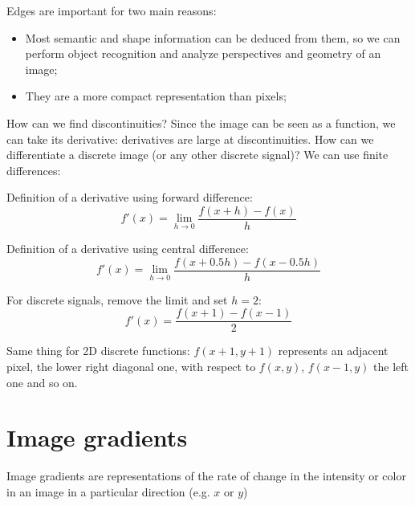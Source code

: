 \documentclass{article}
\begin{document}
Edges are important for two main reasons:

\begin{itemize}
    \item Most semantic and shape information can be deduced from them, so we can perform object recognition and analyze perspectives and geometry of an image;
    \item They are a more compact representation than pixels;
\end{itemize}

How can we find discontinuities? Since the image can be seen as a function, we can take its derivative: derivatives are large at discontinuities.
How can we differentiate a discrete image (or any other discrete signal)? We can use finite differences:

\vspace{0.5cm}

Definition of a derivative using forward difference:
\begin{equation*}
    f'(x) = \lim_{h\to 0} \frac{f(x + h) - f(x)}{h}
\end{equation*}

\vspace{0.5cm}

Definition of a derivative using central difference:
\begin{equation*}
    f'(x) = \lim_{h\to 0} \frac{f(x + 0.5h) - f(x - 0.5h)}{h}
\end{equation*}

\vspace{0.5cm}

For discrete signals, remove the limit and set $h = 2$:
\begin{equation*}
    f'(x) = \frac{f(x + 1) - f(x - 1)}{2}
\end{equation*}

\vspace{0.5cm}

Same thing for 2D discrete functions: $f(x + 1, y + 1)$ represents an adjacent pixel, the lower right diagonal one, with respect to $f(x, y)$, $f(x - 1, y)$ the left one and so on.

\newpage

\section*{Image gradients}

Image gradients are representations of the rate of change in the intensity or color in an image in a particular direction (e.g. $x$ or $y$)
\end{document}
